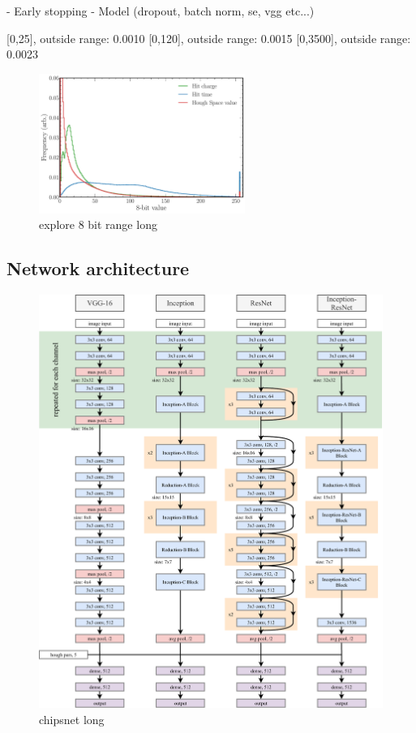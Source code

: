 - Early stopping
- Model (dropout, batch norm, se, vgg etc...)

[0,25], outside range: 0.0010
    [0,120], outside range: 0.0015
    [0,3500], outside range: 0.0023

\begin{figure} %
    \includegraphics[width=0.6\textwidth]{diagrams/7-cvn/chipsnet/explore_8_bit_range.pdf}
    \caption[explore 8 bit range short]
    {explore 8 bit range long}
    \label{fig:explore_8_bit_range}
\end{figure}

\subsection{Network architecture} %
\label{sec:cvn_baseline_architecture} %

\begin{figure} %
    \includegraphics[width=\textwidth]{diagrams/7-cvn/chipsnet.pdf}
    \caption[chipsnet short]
    {chipsnet long}
    \label{fig:chipsnet}
\end{figure}


